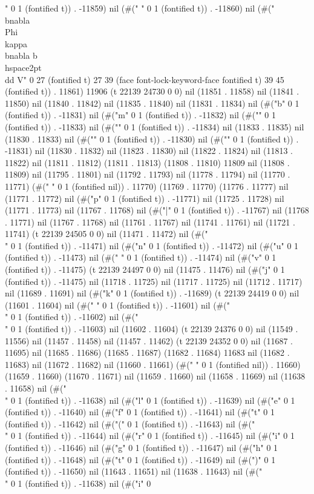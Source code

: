 " 0 1 (fontified t)) . -11859) nil (#(" " 0 1 (fontified t)) . -11860) nil (#("\\bnabla\\Phi\\kappa\\bnabla b \\hspace{2pt} \\dd V" 0 27 (fontified t) 27 39 (face font-lock-keyword-face fontified t) 39 45 (fontified t)) . 11861) 11906 (t 22139 24730 0 0) nil (11851 . 11858) nil (11841 . 11850) nil (11840 . 11842) nil (11835 . 11840) nil (11831 . 11834) nil (#("b" 0 1 (fontified t)) . -11831) nil (#("m" 0 1 (fontified t)) . -11832) nil (#("{" 0 1 (fontified t)) . -11833) nil (#("}" 0 1 (fontified t)) . -11834) nil (11833 . 11835) nil (11830 . 11833) nil (#("{" 0 1 (fontified t)) . -11830) nil (#("}" 0 1 (fontified t)) . -11831) nil (11830 . 11832) nil (11823 . 11830) nil (11822 . 11824) nil (11813 . 11822) nil (11811 . 11812) (11811 . 11813) (11808 . 11810) 11809 nil (11808 . 11809) nil (11795 . 11801) nil (11792 . 11793) nil (11778 . 11794) nil (11770 . 11771) (#(" " 0 1 (fontified nil)) . 11770) (11769 . 11770) (11776 . 11777) nil (11771 . 11772) nil (#("p" 0 1 (fontified t)) . -11771) nil (11725 . 11728) nil (11771 . 11773) nil (11767 . 11768) nil (#("|" 0 1 (fontified t)) . -11767) nil (11768 . 11771) nil (11767 . 11768) nil (11761 . 11767) nil (11741 . 11761) nil (11721 . 11741) (t 22139 24505 0 0) nil (11471 . 11472) nil (#("\\" 0 1 (fontified t)) . -11471) nil (#("n" 0 1 (fontified t)) . -11472) nil (#("u" 0 1 (fontified t)) . -11473) nil (#(" " 0 1 (fontified t)) . -11474) nil (#("v" 0 1 (fontified t)) . -11475) (t 22139 24497 0 0) nil (11475 . 11476) nil (#("j" 0 1 (fontified t)) . -11475) nil (11718 . 11725) nil (11717 . 11725) nil (11712 . 11717) nil (11689 . 11691) nil (#("k" 0 1 (fontified t)) . -11689) (t 22139 24419 0 0) nil (11601 . 11604) nil (#(" " 0 1 (fontified t)) . -11601) nil (#("\\" 0 1 (fontified t)) . -11602) nil (#("\\" 0 1 (fontified t)) . -11603) nil (11602 . 11604) (t 22139 24376 0 0) nil (11549 . 11556) nil (11457 . 11458) nil (11457 . 11462) (t 22139 24352 0 0) nil (11687 . 11695) nil (11685 . 11686) (11685 . 11687) (11682 . 11684) 11683 nil (11682 . 11683) nil (11672 . 11682) nil (11660 . 11661) (#(" " 0 1 (fontified nil)) . 11660) (11659 . 11660) (11670 . 11671) nil (11659 . 11660) nil (11658 . 11669) nil (11638 . 11658) nil (#("\\" 0 1 (fontified t)) . -11638) nil (#("l" 0 1 (fontified t)) . -11639) nil (#("e" 0 1 (fontified t)) . -11640) nil (#("f" 0 1 (fontified t)) . -11641) nil (#("t" 0 1 (fontified t)) . -11642) nil (#("(" 0 1 (fontified t)) . -11643) nil (#("\\" 0 1 (fontified t)) . -11644) nil (#("r" 0 1 (fontified t)) . -11645) nil (#("i" 0 1 (fontified t)) . -11646) nil (#("g" 0 1 (fontified t)) . -11647) nil (#("h" 0 1 (fontified t)) . -11648) nil (#("t" 0 1 (fontified t)) . -11649) nil (#(")" 0 1 (fontified t)) . -11650) nil (11643 . 11651) nil (11638 . 11643) nil (#("\\" 0 1 (fontified t)) . -11638) nil (#("i" 0 